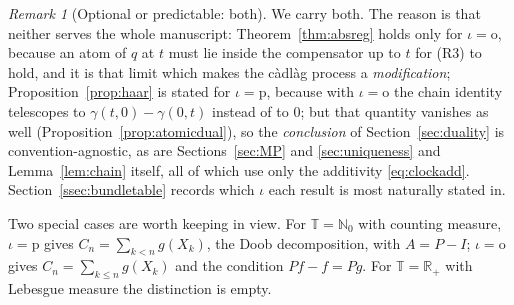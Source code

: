 \documentclass[11pt,a4paper]{article}
\theoremstyle{plain}
\theoremstyle{definition}
\theoremstyle{remark}
\newtheorem{remark}[theorem]{Remark}
\newcommand{\R}{\mathbb{R}}
\newcommand{\N}{\mathbb{N}}
\newcommand{\Rp}{\R_+}
\newcommand{\T}{\mathbb{T}}                     %
\begin{document}
\begin{remark}[Optional or predictable: both]
  We carry both.  The reason is that neither serves the whole manuscript:
  Theorem~\ref{thm:absreg} holds only for $\iota = \mathrm{o}$, because an atom of
  $q$ at $t$ must lie inside the compensator up to $t$ for (R3) to hold, and it is
  that limit which makes the c\`adl\`ag process a \emph{modification};
  Proposition~\ref{prop:haar} is stated for $\iota = \mathrm{p}$, because with
  $\iota = \mathrm{o}$ the chain identity telescopes to
  $\gamma(t,0) - \gamma(0,t)$ instead of to $0$; but that quantity vanishes as
  well (Proposition~\ref{prop:atomicdual}), so the \emph{conclusion} of
  Section~\ref{sec:duality} is convention-agnostic, as are Sections~\ref{sec:MP}
  and \ref{sec:uniqueness} and Lemma~\ref{lem:chain} itself, all of which use
  only the additivity \eqref{eq:clockadd}.  Section~\ref{ssec:bundletable}
  records which $\iota$ each result is most naturally stated in.

  Two special cases are worth keeping in view.  For $\T = \N_0$ with counting
  measure, $\iota = \mathrm{p}$ gives $C_n = \sum_{k<n} g(X_k)$, the Doob
  decomposition, with $A = P - I$; $\iota = \mathrm{o}$ gives
  $C_n = \sum_{k \leq n} g(X_k)$ and the condition $Pf - f = Pg$.  For
  $\T = \Rp$ with Lebesgue measure the distinction is empty.
\end{remark}
\end{document}
